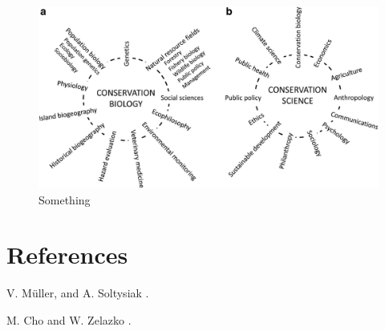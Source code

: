 \documentclass[
  ignorenonframetext,
]{beamer}
\begin{document}
\begin{frame}
\begin{figure}

{\centering \includegraphics{../figures/class_1_consbio_and_conssciece.jpeg}

}

\caption{Something}

\end{figure}
\end{frame}

\hypertarget{references}{%
\section{References}\label{references}}

\begin{frame}

\begin{thebibliography}{10}
\alert{V. M\"uller, and A. Soltysiak}
.

\alert{M. Cho and W. Zelazko}
.
\end{thebibliography}
\end{frame}
\end{document}
